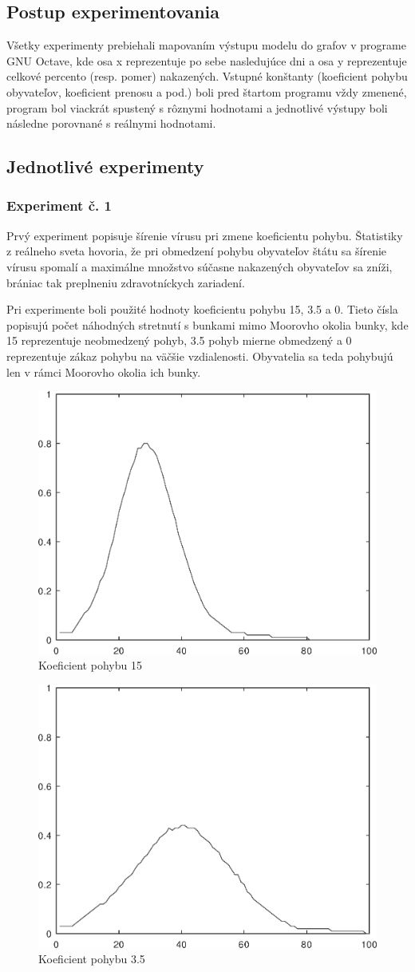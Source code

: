\documentclass[11pt,a4paper,titlepage]{article}
\begin{document}
\subsection{Postup experimentovania}
Všetky experimenty prebiehali mapovaním výstupu modelu do grafov v programe GNU Octave, kde osa x reprezentuje po sebe nasledujúce dni a osa y reprezentuje celkové percento (resp. pomer) nakazených. Vstupné konštanty (koeficient pohybu obyvateľov, koeficient prenosu a pod.) boli pred štartom programu vždy zmenené, program bol viackrát spustený s rôznymi hodnotami a jednotlivé výstupy boli následne porovnané s reálnymi hodnotami.

\subsection{Jednotlivé experimenty}
\subsubsection{Experiment č. 1}
Prvý experiment popisuje šírenie vírusu pri zmene koeficientu pohybu. Štatistiky z reálneho sveta hovoria, že pri obmedzení pohybu obyvateľov štátu sa šírenie vírusu spomalí a maximálne množstvo súčasne nakazených obyvateľov sa zníži, brániac tak preplneniu zdravotníckych zariadení.

Pri experimente boli použité hodnoty koeficientu pohybu 15, 3.5 a 0. Tieto čísla popisujú počet náhodných stretnutí s bunkami mimo Moorovho okolia bunky, kde 15 reprezentuje neobmedzený pohyb, 3.5 pohyb mierne obmedzený a 0 reprezentuje zákaz pohybu na väčšie vzdialenosti. Obyvatelia sa teda pohybujú len v rámci Moorovho okolia ich bunky.

\begin{figure}[h!]
    \center
    \includegraphics[width=.39\linewidth]{movement-rate-15.eps}
    \caption{Koeficient pohybu 15}
\end{figure}

\begin{figure}[h!]
    \center
    \includegraphics[width=.39\linewidth]{movement-rate-3_5.eps}
    \caption{Koeficient pohybu 3.5}
\end{figure}
\end{document}
